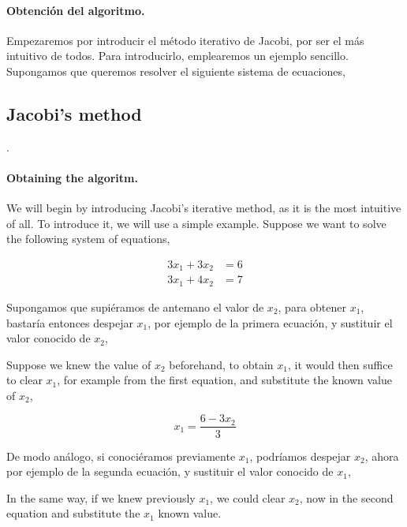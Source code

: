 \begin{paracol}{2}
\paragraph{Obtención del algoritmo.}Empezaremos por introducir el método iterativo de Jacobi, por ser el más intuitivo de todos. Para introducirlo, emplearemos un ejemplo sencillo. Supongamos que queremos resolver el siguiente sistema de ecuaciones,

\switchcolumn
\subsection{Jacobi's method}. 

\paragraph{Obtaining the algoritm.} We will begin by introducing Jacobi's iterative method, as it is the most intuitive of all. To introduce it, we will use a simple example. Suppose we want to solve the following system of equations,
\end{paracol}


\begin{align*}
3x_1+3x_2&=6\\
3x_1+4x_2&=7
\end{align*}

\begin{paracol}{2}
Supongamos que supiéramos de antemano el valor de $x_2$, para obtener $x_1$, bastaría entonces despejar $x_1$, por ejemplo de la primera ecuación, y sustituir el valor conocido de $x_2$,

    \switchcolumn
Suppose we knew the value of $x_2$ beforehand, to obtain $x_1$, it would then suffice to clear $x_1$, for example from the first equation, and substitute the known value of $x_2$,
\end{paracol}


\begin{equation*}
x_1=\frac{6-3x_2}{3}
\end{equation*}

\begin{paracol}{2}

De modo análogo, si conociéramos previamente $x_1$, podríamos despejar $x_2$, ahora por ejemplo de la segunda ecuación, y sustituir el valor conocido de $x_1$,

    \switchcolumn
In the same way, if we knew previously $x_1$, we could clear $x_2$, now in the second equation and substitute the $x_1$ known value.
\end{paracol}

